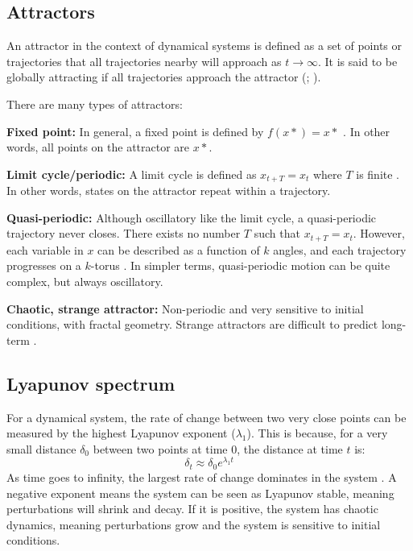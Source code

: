 \documentclass[letterpaper]{article}
\begin{document}
\subsection{Attractors}

An attractor in the context of dynamical systems is defined as a set of points or trajectories that all trajectories nearby will approach as $t \rightarrow \infty$. It is said to be globally attracting if all trajectories approach the attractor (\cite[p.\ 130]{strogatz2001nonlinear}; \cite[p.\ 13]{datseris2022nonlinear}). 

There are many types of attractors:

\textbf{Fixed point:} In general, a fixed point is defined by $f(x*) = x*$ \citep[p. 4]{datseris2022nonlinear}. In other words, all points on the attractor are $x*$.

\textbf{Limit cycle/periodic:} A limit cycle is defined as $x_{t+T} = x_t$ where $T$ is finite \citep[p.\ 4]{datseris2022nonlinear}. In other words, states on the attractor repeat within a trajectory.  

\textbf{Quasi-periodic:} Although oscillatory like the limit cycle, a quasi-periodic trajectory never closes. There exists no number $T$ such that $x_{t+T} = x_t$. However, each variable in $x$ can be described as a function  of $k$ angles, and each trajectory progresses on a $k$-torus \citep[p.\ 30]{datseris2022nonlinear}. In simpler terms, quasi-periodic motion can be quite complex, but always oscillatory. 

\textbf{Chaotic, strange attractor:} Non-periodic and very sensitive to initial conditions, with fractal geometry. Strange attractors are difficult to predict long-term \citep[p.\ 40]{datseris2022nonlinear} \citep[p.\ 333]{strogatz2001nonlinear}.   

\subsection{Lyapunov spectrum}

For a dynamical system, the rate of change between two very close points can be measured by the highest Lyapunov exponent ($\lambda_1$). This is because, for a very small distance $\delta_0$ between two points at time $0$, the distance at time $t$ is:
\begin{equation}
    \delta_t \approx \delta_0 e^{\lambda_1 t}
    \label{eq:distance}
\end{equation}
As time goes to infinity, the largest rate of change dominates in the system \citep[p.\ 38]{datseris2022nonlinear}. A negative exponent means the system can be seen as Lyapunov stable, meaning perturbations will shrink and decay. If it is positive, the system has chaotic dynamics, meaning perturbations grow and the system is sensitive to initial conditions.
\end{document}
